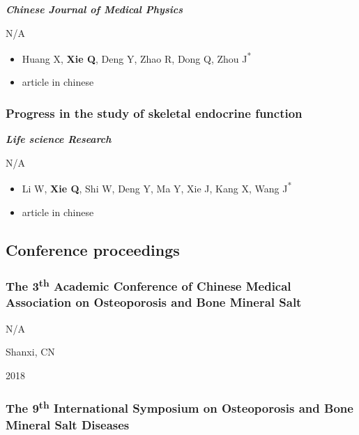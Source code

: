 \documentclass[
]{article}
\providecommand{\tightlist}{%
  \setlength{\itemsep}{0pt}\setlength{\parskip}{0pt}}
\begin{document}
\textbf{\emph{Chinese Journal of Medical Physics}}

N/A

\begin{itemize}
\tightlist
\item
  Huang X, \textbf{Xie Q}, Deng Y, Zhao R, Dong Q, Zhou
  J\textsuperscript{*}
\item
  article in chinese
\end{itemize}

\hypertarget{progress-in-the-study-of-skeletal-endocrine-function}{%
\subsubsection{Progress in the study of skeletal endocrine
function}\label{progress-in-the-study-of-skeletal-endocrine-function}}

\textbf{\emph{Life science Research}}

N/A

\begin{itemize}
\tightlist
\item
  Li W, \textbf{Xie Q}, Shi W, Deng Y, Ma Y, Xie J, Kang X, Wang
  J\textsuperscript{*}
\item
  article in chinese
\end{itemize}

\hypertarget{conference-proceedings}{%
\subsection{Conference proceedings}\label{conference-proceedings}}

\hypertarget{the-3th-academic-conference-of-chinese-medical-association-on-osteoporosis-and-bone-mineral-salt}{%
\subsubsection{\texorpdfstring{The 3\textsuperscript{th} Academic
Conference of Chinese Medical Association on Osteoporosis and Bone
Mineral
Salt}{The 3th Academic Conference of Chinese Medical Association on Osteoporosis and Bone Mineral Salt}}\label{the-3th-academic-conference-of-chinese-medical-association-on-osteoporosis-and-bone-mineral-salt}}

N/A

Shanxi, CN

2018

\hypertarget{the-9th-international-symposium-on-osteoporosis-and-bone-mineral-salt-diseases}{%
\subsubsection{\texorpdfstring{The 9\textsuperscript{th} International
Symposium on Osteoporosis and Bone Mineral Salt
Diseases}{The 9th International Symposium on Osteoporosis and Bone Mineral Salt Diseases}}\label{the-9th-international-symposium-on-osteoporosis-and-bone-mineral-salt-diseases}}
\end{document}
